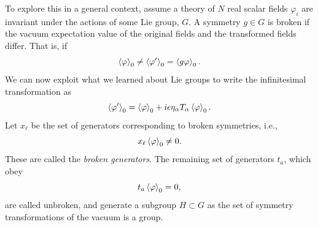 To explore this in a general context, assume a theory of $N$ real scalar fields $\varphi_i$ are invariant under the actions of some Lie group, $G$.
A symmetry $g \in G$ is broken if the vacuum expectation value of the original fields and the transformed fields differ.
That is, if
%
\begin{equation}
    \left \langle \varphi \right \rangle_0 \neq \left \langle \varphi' \right \rangle_0 = \left \langle g \varphi \right \rangle_0.
\end{equation}
%
We can now exploit what we learned about Lie groups to write the infinitesimal transformation as
%
\begin{equation}
    \left \langle \varphi' \right \rangle_0 = \left \langle \varphi \right \rangle_0 + i \epsilon \eta_\alpha T_\alpha \left \langle \varphi \right \rangle_0.
\end{equation}
%
Let $x_\ell$ be the set of generators corresponding to broken symmetries, i.e.,
%
\begin{equation}
    x_\ell \left \langle \varphi \right \rangle_0 \neq 0.
\end{equation}
%
These are called the \emph{broken generators}.
The remaining set of generators $t_a$, which obey
%
\begin{equation}
    t_a \left \langle \varphi \right \rangle_0 = 0,
\end{equation}
%
are called unbroken, and generate a subgroup $H \subset G$ as the set of symmetry transformations of the vacuum is a group.

